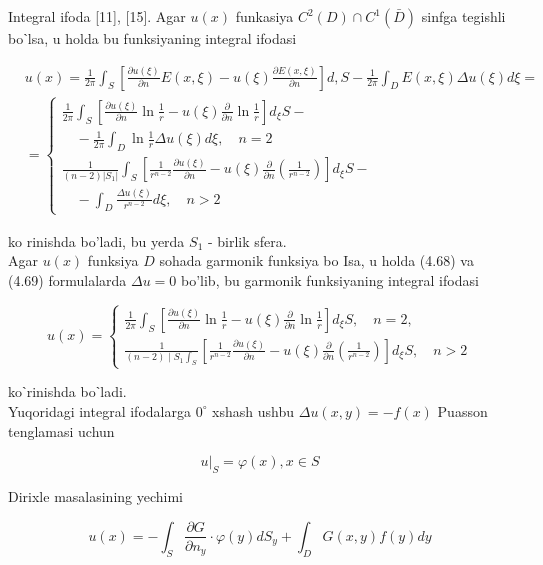 \documentclass[10pt]{article}
\begin{document}
Integral ifoda [11], [15]. Agar $u(x)$ funkasiya $C^{2}(D) \cap C^{1}(\bar{D})$ sinfga tegishli boˋlsa, u holda bu funksiyaning integral ifodasi


\begin{align*}
& u(x)=\frac{1}{2 \pi} \int_{S}\left[\frac{\partial u(\xi)}{\partial n} E(x, \xi)-u(\xi) \frac{\partial E(x, \xi)}{\partial n}\right] d, S-\frac{1}{2 \pi} \int_{D} E(x, \xi) \Delta u(\xi) d \xi= \\
& =\left\{\begin{array}{l}
\frac{1}{2 \pi} \int_{S}\left[\frac{\partial u(\xi)}{\partial n} \ln \frac{1}{r}-u(\xi) \frac{\partial}{\partial n} \ln \frac{1}{r}\right] d_{\xi} S- \\
\quad-\frac{1}{2 \pi} \int_{D} \ln \frac{1}{r} \Delta u(\xi) d \xi, \quad n=2 \\
\frac{1}{(n-2)\left|S_{1}\right|} \int_{S}\left[\frac{1}{r^{n-2}} \frac{\partial u(\xi)}{\partial n}-u(\xi) \frac{\partial}{\partial n}\left(\frac{1}{r^{n-2}}\right)\right] d_{\xi} S- \\
\quad-\int_{D} \frac{\Delta u(\xi)}{r^{n-2}} d \xi, \quad n>2
\end{array}\right. \tag{4.68}
\end{align*}


ko rinishda bo'ladi, bu yerda $S_{1}$ - birlik sfera.\\
Agar $u(x)$ funksiya $D$ sohada garmonik funksiya bo Isa, u holda (4.68) va (4.69) formulalarda $\Delta u=0$ bo'lib, bu garmonik funksiyaning integral ifodasi

\[
u(x)=\left\{\begin{array}{l}
\frac{1}{2 \pi} \int_{S}\left[\frac{\partial u(\xi)}{\partial n} \ln \frac{1}{r}-u(\xi) \frac{\partial}{\partial n} \ln \frac{1}{r}\right] d_{\xi} S, \quad n=2,  \tag{4.70}\\
\frac{1}{(n-2) \mid S_{1} \int_{S}}\left[\frac{1}{r^{n-2}} \frac{\partial u(\xi)}{\partial n}-u(\xi) \frac{\partial}{\partial n}\left(\frac{1}{r^{n-2}}\right)\right] d_{\xi} S, \quad n>2
\end{array}\right.
\]

koˋrinishda boˋladi.\\
Yuqoridagi integral ifodalarga $0^{\circ}$ xshash ushbu $\Delta u(x, y)=-f(x)$ Puasson tenglamasi uchun

$$
\left.u\right|_{S}=\varphi(x), x \in S
$$

Dirixle masalasining yechimi


\begin{equation*}
u(x)=-\int_{S} \frac{\partial G}{\partial n_{y}} \cdot \varphi(y) d S_{y}+\int_{D} G(x, y) f(y) d y \tag{4.72}
\end{equation*}
\end{document}
